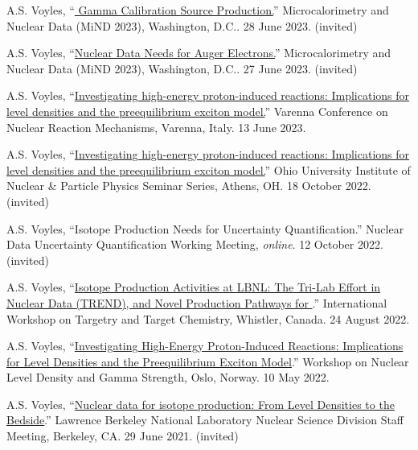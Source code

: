 \begin{bibsection}
\item A.S. Voyles, \enquote{\href{https://conferences.lbl.gov/event/1243/contributions/7407/}{ Gamma Calibration Source Production.}} Microcalorimetry and Nuclear Data (MiND 2023), Washington, D.C.. 28 June 2023. (invited)

\item A.S. Voyles, \enquote{\href{https://conferences.lbl.gov/event/1243/contributions/7398/}{Nuclear Data Needs for Auger
Electrons.}} Microcalorimetry and Nuclear Data (MiND 2023), Washington, D.C.. 27 June 2023. (invited)

\item A.S. Voyles, \enquote{\href{https://indico.cern.ch/event/1132769/contributions/5395295/}{Investigating high-energy proton-induced reactions: Implications for level densities and the preequilibrium exciton model.}}  Varenna Conference on Nuclear Reaction Mechanisms, Varenna, Italy. 13 June 2023. 

\item A.S. Voyles, \enquote{\href{https://inpp.ohio.edu/~inpp/seminars/abstracts_fall2022/INPP_18Oct22.pdf}{Investigating high-energy proton-induced reactions: Implications for level densities and the preequilibrium exciton model.}} Ohio University Institute of Nuclear \& Particle Physics Seminar Series, Athens, OH. 18 October 2022. (invited)

\item A.S. Voyles, \enquote{Isotope Production Needs for Uncertainty Quantification.} Nuclear Data Uncertainty Quantification Working Meeting, \emph{online}. 12 October 2022. (invited)

\item A.S. Voyles, \enquote{\href{https://meetings.triumf.ca/event/108/contributions/3718/}{Isotope Production Activities at LBNL: The Tri-Lab Effort in Nuclear Data (TREND), and Novel Production Pathways for }.}  International Workshop on Targetry and Target Chemistry, Whistler, Canada. 24 August 2022.

\item A.S. Voyles, \enquote{\href{https://www.mn.uio.no/fysikk/english/research/news-and-events/events/conferences/gamma8/program/book_of_abstracts.pdf}{Investigating High-Energy Proton-Induced Reactions: Implications for Level Densities and the Preequilibrium Exciton Model}.}   Workshop on Nuclear Level Density and Gamma Strength, Oslo, Norway. 10 May 2022.

\item A.S. Voyles, \enquote{\href{https://conferences.lbl.gov/event/541/}{Nuclear data for isotope production: From Level Densities to the Bedside}.} Lawrence Berkeley National Laboratory Nuclear Science Division Staff Meeting, Berkeley, CA. 29 June 2021. (invited)




\end{bibsection}
